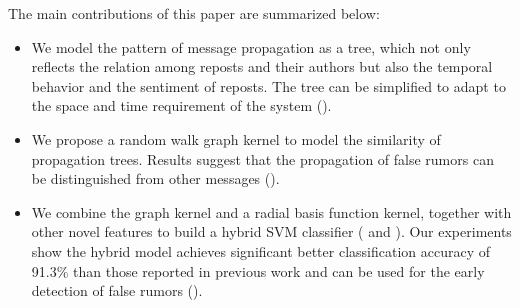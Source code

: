 %
%

The main contributions of this paper are summarized below:
\begin{itemize}
\item  We model the pattern of message propagation as a tree, which
not only reflects the relation among reposts and their authors but also
the temporal behavior and the sentiment of reposts. The tree can be
simplified to adapt to the space and time requirement of the system
().
\item  We propose a random walk graph kernel to model the similarity of
propagation trees. Results suggest that the propagation of false rumors
can be distinguished from other messages ().
\item  We combine the graph kernel and a radial basis function kernel,
together with other novel features to build a hybrid SVM classifier
( and ).
Our experiments show the hybrid model achieves significant better
classification accuracy of 91.3\% than those reported in
previous work and can be used for the early detection of false rumors
().
\end{itemize}
